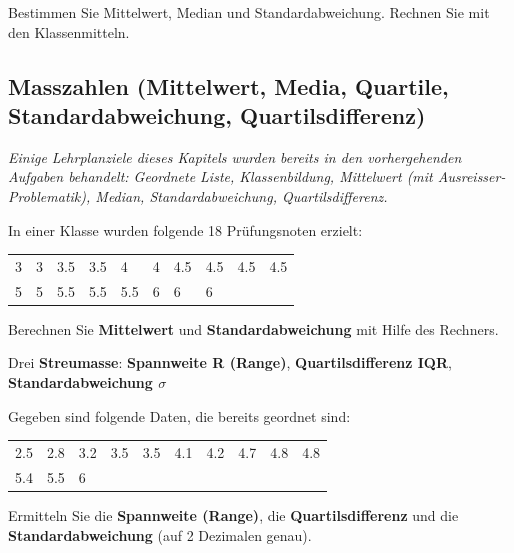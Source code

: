 
Bestimmen Sie Mittelwert, Median und Standardabweichung.
Rechnen Sie mit den Klassenmitteln.


\newpage














\subsection{Masszahlen (Mittelwert, Media, Quartile,
  Standardabweichung, Quartilsdifferenz)}

\textit{Einige Lehrplanziele dieses Kapitels wurden bereits in den
  vorhergehenden Aufgaben behandelt: Geordnete Liste, Klassenbildung,
  Mittelwert (mit Ausreisser-Problematik), Median, Standardabweichung,
  Quartilsdifferenz.}

 In einer Klasse wurden folgende 18 Prüfungsnoten erzielt:

  \begin{tabular}{llllllllll}
    3 & 3 & 3.5 & 3.5 & 4   & 4 & 4.5 & 4.5 & 4.5 & 4.5\\
    5 & 5 & 5.5 & 5.5 & 5.5 & 6 & 6   & 6
  \end{tabular}

  Berechnen Sie \textbf{Mittelwert} und \textbf{Standardabweichung}
  mit Hilfe des Rechners.









 Drei \textbf{Streumasse}: \textbf{Spannweite R (Range)},
  \textbf{Quartilsdifferenz IQR}, \textbf{Standardabweichung $\sigma$}

  Gegeben sind folgende Daten, die bereits geordnet sind:

  \begin{tabular}{llllllllll}
    2.5 & 2.8 & 3.2 & 3.5 & 3.5 & 4.1 & 4.2 & 4.7 & 4.8 & 4.8\\
    5.4 & 5.5 & 6
  \end{tabular}

  Ermitteln Sie die \textbf{Spannweite (Range)}, die
  \textbf{Quartilsdifferenz} und die \textbf{Standardabweichung} (auf
  2 Dezimalen genau).
  
  

\newpage
